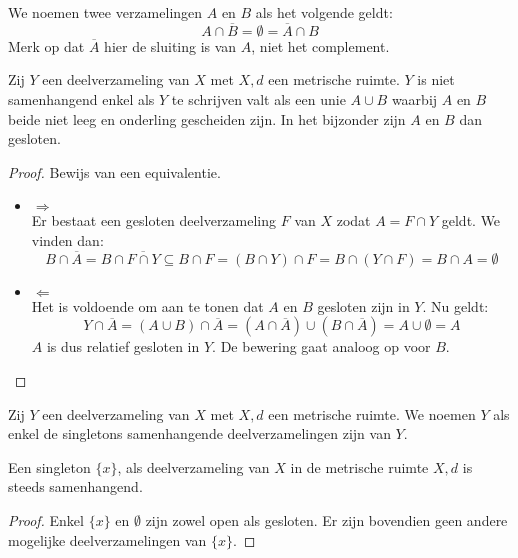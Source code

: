 \documentclass[main.tex]{subfiles}
\begin{document}
\begin{de}
  We noemen twee verzamelingen $A$ en $B$  als het volgende geldt:
  \[ A \cap \overline{B} = \emptyset = \overline{A} \cap B \]
  Merk op dat $\overline{A}$ hier de sluiting is van $A$, niet het complement.
\end{de}

\begin{bpr}
  \label{pr:karakterisatie-niet-samenhangend}
  Zij $Y$ een deelverzameling van $X$ met $X,d$ een metrische ruimte.
  $Y$ is niet samenhangend enkel als $Y$ te schrijven valt als een unie $A \cup B$ waarbij $A$ en $B$ beide niet leeg en onderling gescheiden zijn.
  In het bijzonder zijn $A$ en $B$ dan gesloten.

  \begin{proof}
    Bewijs van een equivalentie.
    \begin{itemize}
    \item $\Rightarrow$\\
      Er bestaat een gesloten deelverzameling $F$ van $X$ zodat $A = F \cap Y$ geldt.
      We vinden dan:
      \[ B \cap \overline{A} = B \cap \overline{F \cap Y} \subseteq B \cap F = (B \cap Y) \cap F = B \cap (Y \cap F) = B \cap A = \emptyset \]
    \item $\Leftarrow$\\
      Het is voldoende om aan te tonen dat $A$ en $B$ gesloten zijn in $Y$.
      Nu geldt:
      \[ Y \cap \overline{A} = (A \cup B) \cap \overline{A} = (A \cap \overline{A}) \cup (B \cap \overline{A}) = A \cup \emptyset = A \]
      $A$ is dus relatief gesloten in $Y$.
      De bewering gaat analoog op voor $B$.
    \end{itemize}
  \end{proof}
\end{bpr}

\begin{de}
  Zij $Y$ een deelverzameling van $X$ met $X,d$ een metrische ruimte.
  We noemen $Y$  als enkel de singletons samenhangende deelverzamelingen zijn van $Y$.
\end{de}

\begin{st}
  \label{st:singleton-samenhangend}
  Een singleton $\{x\}$, als deelverzameling van $X$ in de metrische ruimte $X,d$ is steeds samenhangend.
  
  \begin{proof}
    Enkel $\{x\}$ en $\emptyset$ zijn zowel open als gesloten.
    Er zijn bovendien geen andere mogelijke deelverzamelingen van $\{x\}$.
  \end{proof}
\end{st}
\end{document}
